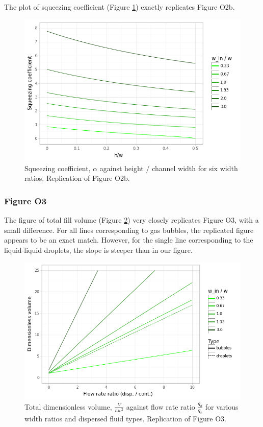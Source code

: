The plot of squeezing coefficient (Figure \ref{fig2b}) exactly replicates Figure O2b.

\begin{figure}[ht]
  \centering
  \includegraphics[width=0.8\linewidth]{../figures/fig_2b.png}
  \caption{Squeezing coefficient, $\alpha$ against height / channel width
  for six width ratios. Replication of Figure O2b.}
  \label{fig2b}
\end{figure}

\subsubsection{Figure O3}

The figure of total fill volume (Figure \ref{fig3}) very closely replicates Figure O3, with a small
difference. For all lines corresponding to gas bubbles, the replicated figure appears to be
an exact match. However, for the single line corresponding to the liquid-liquid droplets, the
slope is steeper than in our figure.

\begin{figure}[ht]
  \centering
  \includegraphics[width=0.8\linewidth]{../figures/fig_3.png}
  \caption{Total dimensionless volume, $\frac{V}{hw^2}$ against flow rate ratio $\frac{q_d}{q_c}$
  for various width ratios and dispersed fluid types. Replication of Figure O3.}
  \label{fig3}
\end{figure}

